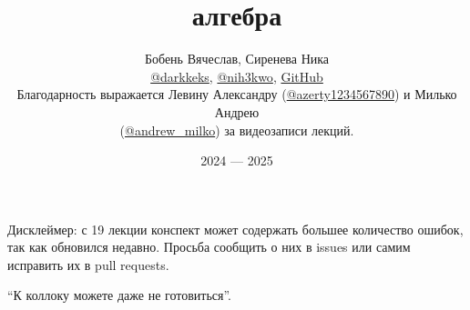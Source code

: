 \documentclass[a4paper]{article}
\title{\HugeЛинейная алгебра}
\author{
	Бобень Вячеслав, Сиренева Ника \\
	\href{https://teleg.run/darkkeks}{@darkkeks},
    \href{https://t.me/nih3kwo}{@nih3kwo},
    \href{https://github.com/LoDThe/hse-tex}{GitHub}\\
    Благодарность выражается Левину Александру (\href{https://teleg.run/azerty1234567890}{@azerty1234567890}) и Милько Андрею \\
    (\href{https://teleg.run/andrew_milko}{@andrew\_milko}) за видеозаписи лекций.
}
\date{2024 --- 2025}
\begin{document}
    \maketitle

    \begin{center}
        Дисклеймер: с 19 лекции конспект может содержать большее количество ошибок, так как обновился недавно. Просьба сообщить о них в issues или самим исправить их в pull requests.
    \end{center}

    \epigraph{
        ``К коллоку можете даже не готовиться''.
    }{}

    \tableofcontents

    \newpage

    
    
    
    
    
    
    
    
    
    
    
    
    
    
    
    
    
    
    
    
    
    
    
    
    
    
    
    
    
    
    
\end{document}
